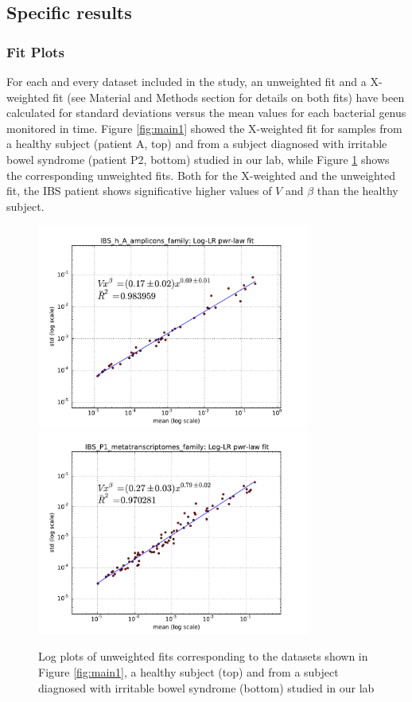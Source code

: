 \subsection*{Specific results}

\subsubsection*{Fit Plots}
For each and every dataset included in the study, an unweighted fit and a X-weighted fit (see Material and Methods section for details on both fits) have been calculated for standard deviations versus the mean values for each bacterial genus monitored in time. Figure \ref{fig:main1} showed the X-weighted fit for samples from a healthy subject (patient A, top) and from a subject diagnosed with irritable bowel syndrome (patient P2, bottom) studied in our lab\cite{IBS}, while Figure \ref{fig:fits} shows the corresponding unweighted fits. Both for the X-weighted and the unweighted fit, the IBS patient shows significative higher values of $V$ and $\beta$ than the healthy subject.

\begin{figure}
	\centering
	\includegraphics[width=0.8\textwidth]{results/fits/IBS_h_A_amplicons_family_stdVSmean_LLR_LOG.pdf}
	\includegraphics[width=0.8\textwidth]{results/fits/IBS_P1_metatranscriptomes_family_stdVSmean_LLR_LOG.pdf}
	\caption{Log plots of unweighted fits corresponding to the datasets shown in Figure \ref{fig:main1}, a healthy subject (top) and from a subject diagnosed with irritable bowel syndrome (bottom) studied in our lab \cite{IBS}}
	\label{fig:fits}
\end{figure}

